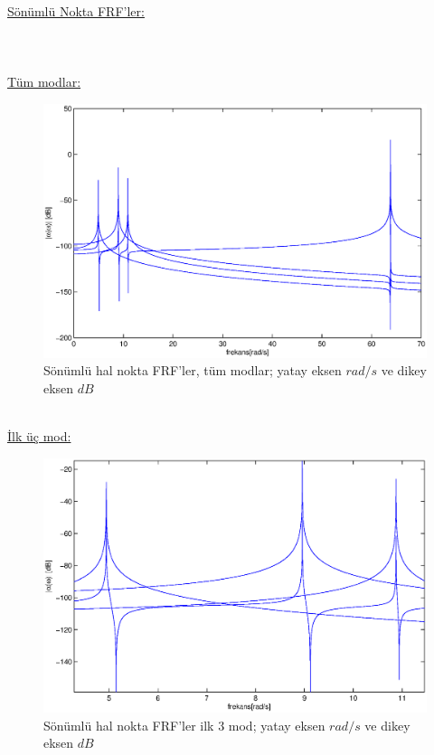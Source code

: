 \documentclass[a4paper]{report}
\begin{document}
~\\
~\\\clearpage
~\\
\underline{Sönümlü Nokta FRF'ler:}\\
~\\
\\~\\
\underline{Tüm modlar:}\\
\begin{figure}[H]\shorthandoff{=}
\centerline{
{\includegraphics[width=1.3\textwidth]{./transferFRFs.eps}}}
\caption[Sönümsüz hal nokta FRF'ler]{Sönümlü hal nokta FRF'ler, tüm modlar; yatay eksen ${rad}/{s}$ ve dikey eksen $dB$ }
\label{fig:noktaFRFs}
\end{figure}\clearpage~\\
\underline{İlk üç mod:}\\
\begin{figure}[H]
\shorthandoff{=}
\centerline{
{\includegraphics[width=1.3\textwidth]{./transferFRFs1-3.eps}}}
\caption[Sönümsüz hal nokta FRF'ler]{Sönümlü hal nokta FRF'ler ilk 3 mod; yatay eksen ${rad}/{s}$ ve dikey eksen $dB$ }
\label{fig:noktaFRFs1-3}
\end{figure}
\end{document}
